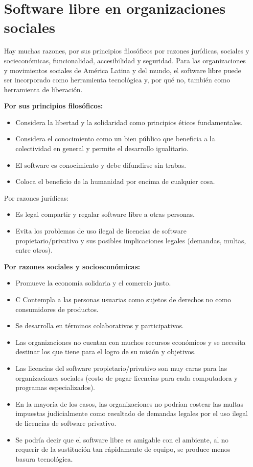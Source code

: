 \section{Software libre en organizaciones sociales}
Hay muchas razones, por sus principios filosóficos por razones jurídicas, sociales y socieconómicas, funcionalidad, accesibilidad y seguridad. Para las organizaciones y movimientos sociales de América Latina y del mundo, el software libre puede ser incorporado como herramienta tecnológica y, por qué no, también como herramienta de liberación.

{\bf Por sus principios filosóficos:}
\begin{itemize}
\item  Considera la libertad y la solidaridad como principios éticos fundamentales.
\item  Considera el conocimiento como un bien público que beneficia a la colectividad en general y permite el desarrollo igualitario.
\item  El software es conocimiento y debe difundirse sin trabas.
\item   Coloca el beneficio de la humanidad por encima de cualquier cosa.
\end{itemize}

Por razones jurídicas:
\begin{itemize}
\item  Es legal compartir y regalar software libre a otras personas.
\item   Evita los problemas de uso ilegal de licencias de software propietario/privativo y sus posibles implicaciones legales (demandas, multas, entre otros).
\end{itemize}

{\bf Por razones sociales y socioeconómicas:}
\begin{itemize}
\item Promueve la economía solidaria y el comercio justo.
\item  C Contempla a las personas usuarias como sujetos de derechos no como consumidores de productos.
\item   Se desarrolla en términos colaborativos y participativos.
\item  Las organizaciones no cuentan con muchos recursos económicos y se necesita destinar los que tiene para el logro de su misión y objetivos.
\item  Las licencias del software propietario/privativo son muy caras para las organizaciones sociales (costo de pagar licencias para cada computadora y programas 
especializados).
\item En la mayoría de los casos, las organizaciones no podrían costear las multas impuestas judicialmente como resultado de demandas legales por el uso ilegal de 
licencias de software privativo.
\item Se podría decir que el software libre es amigable con el ambiente, al no requerir de la sustitución tan rápidamente de equipo, se produce menos basura tecnológica.
\end{itemize}

